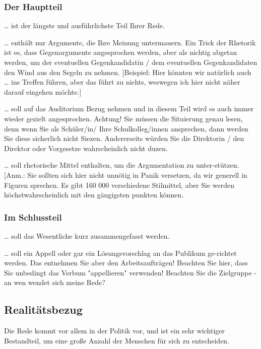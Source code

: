 \subsubsection{Der Hauptteil}
\begin{compactitem}
    \item … ist der längste und ausführlichste Teil Ihrer Rede. 
    \item … enthält nur Argumente, die Ihre Meinung untermauern. Ein Trick der Rhetorik ist es, dass Gegenargumente angesprochen werden, aber als nichtig abgetan werden, um der eventuellen Gegenkandidatin / dem eventuellen Gegenkandidaten den Wind aus den Segeln zu nehmen. [Beispiel: Hier könnten wir natürlich auch … ins Treffen führen, aber das führt zu nichts, weswegen ich hier nicht näher darauf eingehen möchte.] 
    \item … soll auf das Auditorium Bezug nehmen und in diesem Teil wird es auch immer wieder gezielt angesprochen. Achtung! Sie müssen die Situierung genau lesen, denn wenn Sie als Schüler/in/ Ihre Schulkolleg/innen ansprechen, dann werden Sie diese sicherlich nicht Siezen. Andererseits würden Sie die Direktorin / den Direktor oder Vorgesetze wahrscheinlich nicht duzen. 
    \item … soll rhetorische Mittel enthalten, um die Argumentation zu unter-stützen. [Anm.: Sie sollten sich hier nicht unnötig in Panik versetzen, da wir generell in Figuren sprechen. Es gibt 160 000 verschiedene Stilmittel, aber Sie werden höchstwahrscheinlich mit den gängigsten punkten können. 
\end{compactitem}
\subsubsection{Im Schlussteil}
\begin{compactitem}
    \item  … soll das Wesentliche kurz zusammengefasst werden. 
    \item    … soll ein Appell oder gar ein Lösungsvorschlag an das Publikum ge-richtet werden. Das entnehmen Sie aber den Arbeitsaufträgen! Beachten Sie hier, dass Sie unbedingt das Verbum "appellieren" verwenden! Beachten Sie die Zielgruppe - an wen wendet sich meine Rede?
\end{compactitem}

\subsection{Realitätsbezug}
Die Rede kommt vor allem in der Politik vor, und ist ein sehr wichtiger Bestandteil, um eine große Anzahl der Menschen für sich zu entscheiden.  

